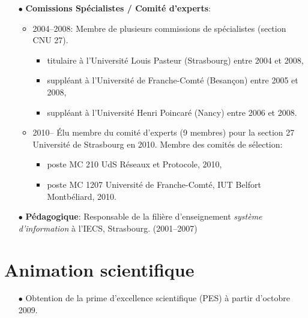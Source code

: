 \begin{itemize}
\item[$\bullet$] \textbf{Comissions Spécialistes / Comité d'experts}:
\begin{itemize}
\item 2004--2008: Membre de plusieurs commissions de spécialistes (section CNU 27).
	\begin{itemize}
		\item titulaire à l'Université Louis Pasteur (Strasbourg) entre 2004 et 2008,
		\item suppléant à l'Université de Franche-Comté (Besançon) entre 2005 et 2008,
		\item suppléant à l'Université Henri Poincaré (Nancy) entre 2006 et 2008.\\
	\end{itemize}
\item 2010-- \'Elu membre du comité d'experts (9 membres) pour la section 27 Université de Strasbourg en 2010.
Membre des comités de sélection:
	\begin{itemize}
		\item poste MC 210 UdS Réseaux et Protocole, 2010,
		\item poste MC 1207 Université de Franche-Comté, IUT Belfort Montbéliard, 2010.\\
	\end{itemize}
\end{itemize}



\item[$\bullet$] \textbf{Pédagogique}:
Responsable de la filière d'enseignement \emph{système d'information} à l'IECS, Strasbourg. (2001--2007)
\end{itemize}
\vspace{1cm}




\section{Animation scientifique}

\begin{itemize}
\item[$\bullet$] Obtention de la prime d'excellence scientifique (PES) à partir d'octobre 2009.
\end{itemize}

